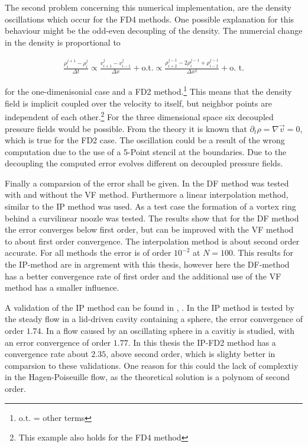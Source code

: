 The second problem concerning this numerical implementation, are the density oscillations
which occur for the FD4 methods.
One possible explanation for this behaviour might be the odd-even decoupling of the density.
The numercial change in the density is  proportional to

\begin{align}
    \frac{\rho^{j+1}_{i} -  \rho^{j}_i}{\Delta t}  \propto \frac{ v^j_{i+1} - v^j_{i-1}}{\Delta x} + \text{o.t.}
     \propto \frac{\rho^{j-1}_{i+2} - 2 \rho^{j-1}_{i}  + \rho^{j-1}_{i-2}}{\Delta x^2} + \text{o. t.}
\end{align}

for the one-dimenisonial case and a FD2 method.\footnote{o.t. = other terms}
This means that the density field is implicit coupled over the velocity to itself,
but neighbor points are independent of each other.\footnote{This example also holds for the FD4 method}
For the three dimensional space six decoupled pressure fields would be possible.
From the theory it is known that $\partial_t \rho  = \nabla \vec{v} =  0$, which is true for the FD2 case.
The oscillation could be a result of the  wrong computation due to the use of a 5-Point stencil at the boundaries.
Due to the decoupling the computed error evolves different on decoupled pressure fields.

Finally a comparsion of the error shall be given.
In \citep{Fadlun2000} the DF method was tested with and without the VF method.
Furthermore a linear interpolation method, similar to the IP method was used.
As a test case the formation of a vortex ring behind a curvilinear noozle was tested.
The results show that for the DF method the error converges below first order, but can be
improved with the VF method to about first order convergence.
The interpolation method is about second order accurate.
For all methods the error is of order $10^{-2}$ at $N=100$.
This results for the IP-method are in argrement with this thesis, however here the DF-method has a better convergence rate of first order and
the additional use of the VF method has a smaller influence.

A validation of the IP method can be found in \citep{Gilmanov2003}, \citep{Gilmanov2005}.
In \citep{Gilmanov2003} the IP method is tested by the steady flow in a lid-driven cavity containing a sphere, the error convergence of order $1.74$.
In  \citep{Gilmanov2005} a flow caused by an oscillating sphere in a cavitiy is studied, with an error convergence of order $1.77$.
In this thesis the IP-FD2 method has a convergence rate about $2.35$, above second order, which is slighty better in comparsion to these validations.
One reason for this could the lack of complextiy in the Hagen-Poiseuille flow, as the theoretical solution is a polynom of second order.





